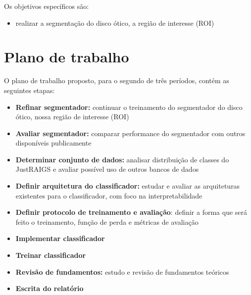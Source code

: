 \documentclass[12pt]{article}
\begin{document}
Os objetivos específicos são:
\begin{itemize}
 \item realizar a segmentação do disco ótico, a região de interesse (ROI)
\end{itemize}

\bigskip

\section{Plano de trabalho}
\label{sec:schedule}

O plano de trabalho proposto, para o segundo de três períodos, contém as seguintes etapas:
\begin{itemize}
    \item \textbf{Refinar segmentador:} continuar o treinamento do segmentador do disco ótico, nossa região de interesse (ROI)
    \item \textbf{Avaliar segmentador:} comparar performance do segmentador com outros disponíveis publicamente
    \item \textbf{Determinar conjunto de dados:} analisar distribuição de classes do JustRAIGS e avaliar possível uso de outros bancos de dados
    \item \textbf{Definir arquitetura do classificador:} estudar e avaliar as arquiteturas existentes para o classificador, com foco na interpretabilidade
    \item \textbf{Definir protocolo de treinamento e avaliação}: definir a forma que será feito o treinamento, função de perda e métricas de avaliação
    \item \textbf{Implementar classificador}
    \item \textbf{Treinar classificador}
    \item \textbf{Revisão de fundamentos:} estudo e revisão de fundamentos teóricos
    \item \textbf{Escrita do relatório}
\end{itemize}
\end{document}
